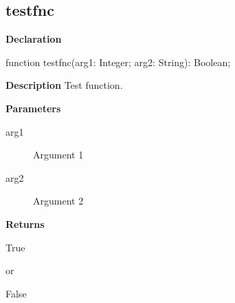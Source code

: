 \documentclass{report}
\begin{document}
\subsection*{testfnc}
\begin{list}{}{
\setlength{\itemindent}{0cm}
\setlength{\listparindent}{0cm}
\setlength{\leftmargin}{\evensidemargin}
\addtolength{\leftmargin}{\tmplength}
\settowidth{\labelsep}{X}
\addtolength{\leftmargin}{\labelsep}
\setlength{\labelwidth}{\tmplength}
}
\begin{flushleft}
\item[\textbf{Declaration}\hfill]
\begin{ttfamily}
function testfnc(arg1: Integer; arg2: String): Boolean;\end{ttfamily}


\end{flushleft}
\par
\item[\textbf{Description}]
Test function.

  \par
\item[\textbf{Parameters}]
\begin{description}
\item[arg1] Argument 1
\item[arg2] Argument 2
\end{description}
\item[\textbf{Returns}]\begin{ttfamily}True\end{ttfamily} or \begin{ttfamily}False\end{ttfamily}


\end{list}
\end{document}
